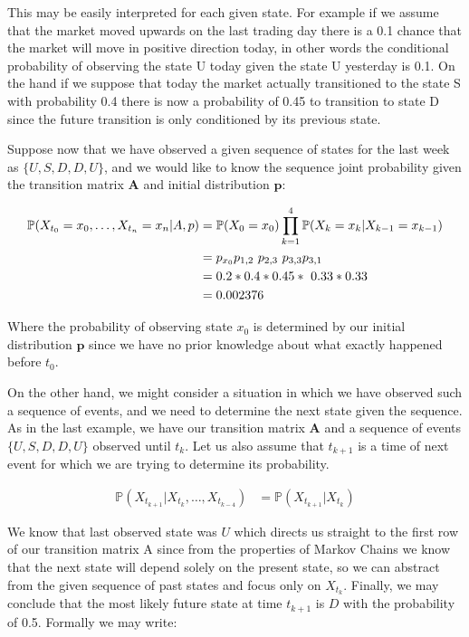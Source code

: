 This may be easily interpreted for each given state. For example if we assume that the market moved upwards on the last trading day there is a 0.1 chance that the market will move in positive direction today, in other words the conditional probability of observing the state U today given the state U yesterday is 0.1. 
On the hand if we suppose that today the market actually transitioned to the state S with probability 0.4 there is now a probability of 0.45 to transition to state D since the future transition is only conditioned by its previous state. 

Suppose now that we have observed a given sequence of states for the last week as $\{U,S,D,D,U\}$, and we would like to know the sequence joint probability given the transition matrix $\textbf{A}$ and initial distribution $\textbf{p}$:

\begin{align}
\mathbb{P}(X_{t_0} = x_0,\ldots,X_{t_n} = x_n|A,p) &= \mathbb{P}(X_0 = x_0) \prod_{k=1}^4 \mathbb{P}(X_k=x_k|X_{k-1}=x_{k-1})\\
&= p_{x_0} p_{1,2}  p_{2,3}  p_{3,3} p_{3,1} \notag\\
&= 0.2 * 0.4 * 0.45 * 0.33 * 0.33 \notag\\
&= 0.002376 \notag
\end{align}

Where the probability of observing state $x_0$ is determined by our initial distribution $\textbf{p}$ since we have no prior knowledge about what exactly happened before $t_0$. 

On the other hand, we might consider a situation in which we have observed such a sequence of events, and we need to determine the next state given the sequence. As in the last example, we have our transition matrix $\textbf{A}$ and a sequence of events $\{U,S,D,D,U\}$ observed until $t_k$. Let us also assume that $t_{k+1}$ is a time of next event for which we are trying to determine its probability.

\begin{align}
    \mathbb{P}(X_{t_{k+1}}|X_{t_{k}},\ldots,X_{t_{k-4}}) &= \mathbb{P}(X_{t_{k+1}}|X_{t_{k}})
\end{align}

We know that last observed state was $U$ which directs us straight to the first row of our transition matrix A since from the properties of Markov Chains we know that the next state will depend solely on the present state, 
so we can abstract from the given sequence of past states and focus only on $X_{t_{k}}$. Finally, we may conclude that the most likely future state at time $t_{k+1}$ is $D$ with the probability of 0.5. Formally we may write:

